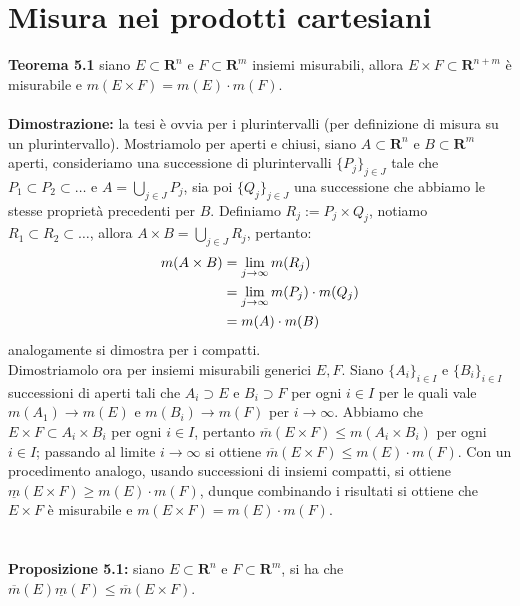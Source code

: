 \documentclass{article}
\begin{document}
\section{Misura nei prodotti cartesiani}
\textbf{Teorema 5.1} siano $E \subset \mathbf{R}^n$ e $F \subset \mathbf{R}^m$ insiemi misurabili, allora $E \times F \subset \mathbf{R}^{n + m}$ è misurabile e $m(E \times F) = m(E) \cdot m(F)$.\\ \\
\textbf{Dimostrazione:} la tesi è ovvia per i plurintervalli (per definizione di misura su un plurintervallo). Mostriamolo per aperti e chiusi, siano $A \subset \mathbf{R}^n$ e $B \subset \mathbf{R}^m$ aperti, consideriamo una successione di plurintervalli $\{ P_j \}_{j \in J}$ tale che $P_1 \subset P_2 \subset \dots$ e $A = \bigcup_{j \in J} P_j$, sia poi $\{ Q_j \}_{j \in J}$ una successione che abbiamo le stesse proprietà precedenti per $B$. Definiamo $R_j := P_j \times Q_j$, notiamo $R_1 \subset R_2 \subset \dots$, allora $A \times B = \bigcup_{j \in J} R_j$, pertanto:
\begin{align}
    m(A \times B) &= \lim_{j \rightarrow \infty} m(R_j) \notag \\
    &= \lim_{j \rightarrow \infty} m(P_j) \cdot m(Q_j) \notag \\
    &= m(A) \cdot m(B) \notag
\end{align}
analogamente si dimostra per i compatti.\\
Dimostriamolo ora per insiemi misurabili generici $E, F$. Siano $\{ A_i \}_{i \in I}$ e $\{ B_i \}_{i \in I}$ successioni di aperti tali che $A_i \supset E$ e $B_i \supset F$ per ogni $i \in I$ per le quali vale $m(A_1) \rightarrow m(E)$ e $m(B_i) \rightarrow m(F)$ per $i \rightarrow \infty$. Abbiamo che $E \times F \subset A_i \times B_i$ per ogni $i \in I$, pertanto $\overline{m}(E \times F) \leq m(A_i \times B_i)$ per ogni $i \in I$; passando al limite $i \rightarrow \infty$ si ottiene $\overline{m}(E \times F) \leq m(E) \cdot m(F)$. Con un procedimento analogo, usando successioni di insiemi compatti, si ottiene $\underline{m}(E \times F) \geq m(E) \cdot m(F)$, dunque combinando i risultati si ottiene che $E \times F$ è misurabile e $m(E \times F) = m(E) \cdot m(F)$. \\ \\ \\
\textbf{Proposizione 5.1:} siano $E \subset \mathbf{R}^n$ e $F \subset \mathbf{R}^m$, si ha che $\overline{m}(E)\underline{m}(F) \leq \overline{m}(E \times F)$. \\ \\
\end{document}
